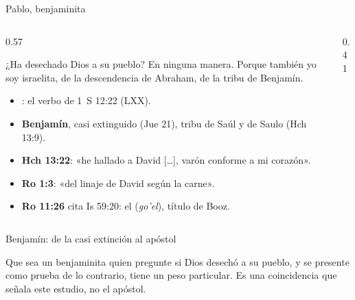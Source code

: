 \begin{frame}{Pablo, benjaminita}
\begin{columns}[c,onlytextwidth]
\begin{column}{0.57\textwidth}
\begin{cita}¿Ha desechado Dios a su pueblo? En ninguna manera. Porque también yo soy israelita, de la descendencia de Abraham, de la tribu de Benjamín.\end{cita}
\scriptsize
\begin{itemize}
\item {}: el verbo de 1~S 12:22 (LXX).
\item \textbf{Benjamín}, casi extinguido (Jue 21), tribu de Saúl y de Saulo (Hch 13:9).
\item \textbf{Hch 13:22}: «he hallado a David [\ldots], varón conforme a mi corazón».
\item \textbf{Ro 1:3}: «del linaje de David según la carne».
\item \textbf{Ro 11:26} cita Is 59:20: el  (\emph{go'el}), título de Booz.
\end{itemize}
\end{column}
\begin{column}{0.41\textwidth}\end{column}
\end{columns}
\end{frame}

\begin{frame}{Benjamín: de la casi extinción al apóstol}
\centering
{}
\elabpropia
\vspace{8pt}
\begin{notalam}[Precisión]
Que sea un benjaminita quien pregunte si Dios desechó a su pueblo, y se presente como prueba de lo contrario, tiene un peso particular. Es una coincidencia que señala este estudio, no el apóstol.
\end{notalam}
\end{frame}

